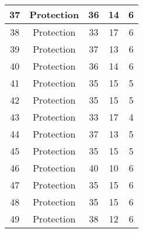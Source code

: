 \documentclass[results.tex]{subfiles}
\begin{document}
\begin{center}
\begin{tabular}{| c || c | c | c | c |}
            \hline
            37                      & Protection                   & 36                     & 14                      & 6                    \\
            \hline
            38                      & Protection                   & 33                     & 17                      & 6                    \\
            \hline
            39                      & Protection                   & 37                     & 13                      & 6                    \\
            \hline
            40                      & Protection                   & 36                     & 14                      & 6                    \\
            \hline
            41                      & Protection                   & 35                     & 15                      & 5                    \\
            \hline
            42                      & Protection                   & 35                     & 15                      & 5                    \\
            \hline
            43                      & Protection                   & 33                     & 17                      & 4                    \\
            \hline
            44                      & Protection                   & 37                     & 13                      & 5                    \\
            \hline
            45                      & Protection                   & 35                     & 15                      & 5                    \\
            \hline
            46                      & Protection                   & 40                     & 10                      & 6                    \\
            \hline
            47                      & Protection                   & 35                     & 15                      & 6                    \\
            \hline
            48                      & Protection                   & 35                     & 15                      & 6                    \\
            \hline
            49                      & Protection                   & 38                     & 12                      & 6                    \\
            \hline
        \end{tabular}
    \end{center}
\end{document}
